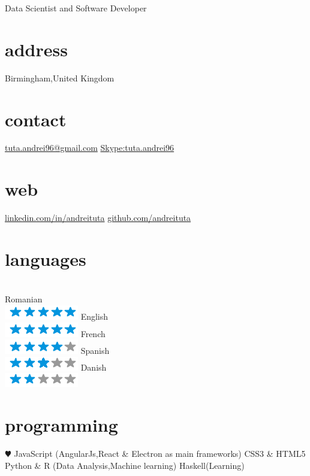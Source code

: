 \documentclass[]{friggeri-cv}
\begin{document}
       {Data Scientist and Software Developer}


\begin{aside}
  \section{address}
    Birmingham,United Kingdom
    ~
    \section{contact}
    \href{mailto:tuta.andrei96@gmail.com}{tuta.andrei96@gmail.com}
    \href{Skype : tuta.andrei96}{Skype:tuta.andrei96}
    ~
    \section{web}
    \href{http://linkedin.com/in/andreituta}{linkedin.com/in/andreituta}
    \href{http://github.com/andreituta}{github.com/andreituta}
    ~ 
    
  \section{languages} 
  \\Romanian \\ \includegraphics[scale=0.30]{img/5stars.png}
  English \\ \includegraphics[scale=0.30]{img/5stars.png}
  French \\ \includegraphics[scale=0.30]{img/4stars.png}
  Spanish \\ \includegraphics[scale=0.30]{img/3stars.png}
  Danish \\ \includegraphics[scale=0.30]{img/2stars.png}
    ~
    
  \section{programming}
    {\color{red} $\varheartsuit$} JavaScript
    (AngularJs,React \& Electron as main frameworks)
    CSS3 \& HTML5
    Python \& R (Data Analysis,Machine learning)
    Haskell(Learning)
    
    ~

\end{aside}
\end{document}
